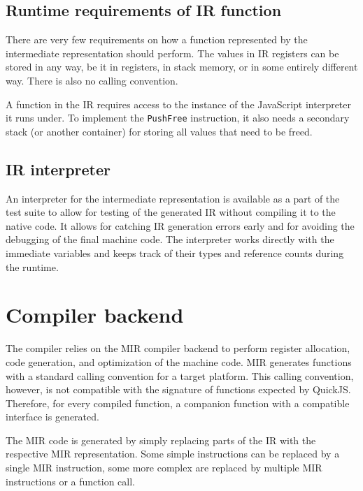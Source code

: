 
\subsection{Runtime requirements of IR function}\label{subsec:irruntime}

There are very few requirements on how a function represented by the intermediate representation should perform. The values in IR registers can be stored in any way, be it in registers, in stack memory, or in some entirely different way. There is also no calling convention.

A function in the IR requires access to the instance of the JavaScript interpreter it runs under. To implement the \texttt{PushFree} instruction, it also needs a secondary stack (or another container) for storing all values that need to be freed.


\subsection{IR interpreter}

An interpreter for the intermediate representation is available as a part of the test suite to allow for testing of the generated IR without compiling it to the native code. It allows for catching IR generation errors early and for avoiding the debugging of the final machine code. The interpreter works directly with the immediate variables and keeps track of their types and reference counts during the runtime.


\section{Compiler backend}

The compiler relies on the MIR compiler backend to perform register allocation, code generation, and optimization of the machine code. MIR generates functions with a standard calling convention for a target platform. This calling convention, however, is not compatible with the signature of functions expected by QuickJS. Therefore, for every compiled function, a companion function with a compatible interface is generated.

The MIR code is generated by simply replacing parts of the IR with the respective MIR representation. Some simple instructions can be replaced by a single MIR instruction, some more complex are replaced by multiple MIR instructions or a function call.

